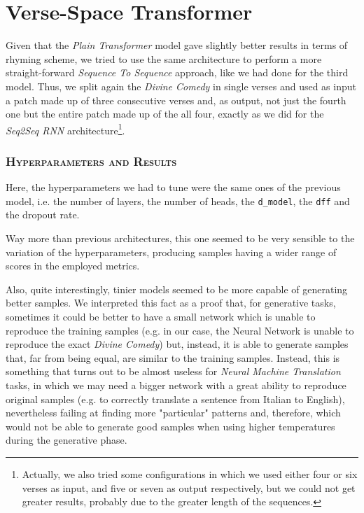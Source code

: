 \section{Verse-Space Transformer}

Given that the \textit{Plain Transformer} model gave slightly better results in terms of rhyming scheme, we tried to use the same architecture to perform a more straight-forward \textit{Sequence To Sequence} approach, like we had done for the third model.
Thus, we split again the \textit{Divine Comedy} in single verses and used as input a patch made up of three consecutive verses and, as output, not just the fourth one but the entire patch made up of the all four, exactly as we did for the \textit{Seq2Seq RNN} architecture\footnote{
    Actually, we also tried some configurations in which we used either four or six verses as input, and five or seven as output respectively, but we could not get greater results, probably due to the greater length of the sequences.
}.

\subsubsection{\textsc{Hyperparameters and Results}}

Here, the hyperparameters we had to tune were the same ones of the previous model, i.e. the number of layers, the number of heads, the \texttt{d\_model}, the \texttt{dff} and the dropout rate.

Way more than previous architectures, this one seemed to be very sensible to the variation of the hyperparameters, producing samples having a wider range of scores in the employed metrics.

Also, quite interestingly, tinier models seemed to be more capable of generating better samples.
We interpreted this fact as a proof that, for generative tasks, sometimes it could be better to have a small network which is unable to reproduce the training samples (e.g. in our case, the Neural Network is unable to reproduce the exact \textit{Divine Comedy}) but, instead, it is able to generate samples that, far from being equal, are similar to the training samples.
Instead, this is something that turns out to be almost useless for \textit{Neural Machine Translation} tasks, in which we may need a bigger network with a great ability to reproduce original samples (e.g. to correctly translate a sentence from Italian to English), nevertheless failing at finding more "particular" patterns and, therefore, which would not be able to generate good samples when using higher temperatures during the generative phase.


